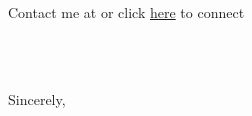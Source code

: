 \usepackage[letterpaper,margin=0.65in]{geometry}
\usepackage[T1]{fontenc}
\usepackage[utf8]{inputenc}
\usepackage[hidelinks]{hyperref}
\usepackage{fontawesome5}
\usepackage{xcolor}
\usepackage{parskip}

\pagestyle{empty}
\setlength{\parindent}{0pt}
\setlength{\parskip}{0.45em}
\renewcommand{\baselinestretch}{1.0}

\newcommand{\lettercontactheader}{%
  \begin{center}
    {\fontsize{23}{27}\selectfont\bfseries \personNameUpper\\[0.35em]}
    {\large
      \faPhone\ \personPhone\ \hspace{0.5em} \textbullet\ \hspace{0.5em} \personAddress\\
      Contact me at \href{mailto:\personEmail}{\personEmail} or click \href{\personLinkedIn}{here} to connect
      \href{\personLinkedIn}{\faLinkedin}
    }
  \end{center}
}



\lettercontactheader

\vspace{2.5em}
\begin{flushright}
  \applicationDate
\end{flushright}

\recipientCompany\\
\recipientDepartment\\
\recipientAddress

\vspace{1em}
\textbf{}

\vspace{0.5em}


\vspace{2em}
Sincerely,

\vspace{1em}
\textbf{\personName}

